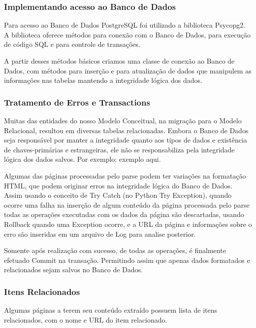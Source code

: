 \documentclass[12pt]{article}
\begin{document}
 
\subsubsection{Implementando acesso ao Banco de Dados}

Para acesso ao Banco de Dados PostgreSQL foi utilizado a biblioteca Psycopg2. A biblioteca oferece métodos para conexão com o Banco de Dados, para execução de código SQL e para controle de transações.

A partir desses métodos básicos criamos uma classe de conexão ao Banco de Dados, com métodos para inserção e para atualização de dados que manipulem as informações nas tabelas mantendo a integridade lógica dos dados.

\subsubsection{Tratamento de Erros e Transactions}

Muitas das entidades do nosso Modelo Conceitual, na migração para o Modelo Relacional, resultou em diversas tabelas relacionadas. Embora o Banco de Dados seja responsável por manter a integridade quanto aos tipos de dados e existência de chaves-primárias e estrangeiras, ele não se responsabiliza pela integridade lógica dos dados salvos. Por exemplo: {exemplo aqui.}


Algumas das páginas processadas pelo parse podem ter variações na formatação HTML, que podem originar erros na integridade lógica do Banco de Dados. Assim usando o conceito de Try Catch (no Python Try Exception), quando ocorre uma falha na inserção de algum conteúdo da página processada pelo parse todas as operações executadas com os dados da página são descartadas, usando Rollback quando uma Exception ocorre, e a URL da página e informações sobre o erro são inseridas em um arquivo de Log para analise posterior.

Somente após realização com sucesso, de todas as operações, é finalmente efetuado Commit na transação. Permitindo assim que apenas dados formatados e relacionados sejam salvos no Banco de Dados.


\subsubsection{Itens Relacionados}



Algumas páginas a terem seu conteúdo extraído possuem lista de itens relacionados, com o nome e URL do item relacionado.
\end{document}
